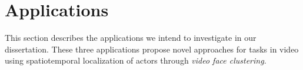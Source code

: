 \section{Applications}
\label{sec:applications}

This section describes the applications we intend to investigate in our dissertation. 
These three applications propose novel approaches for tasks in video using spatiotemporal localization of actors through \emph{video face clustering}.




